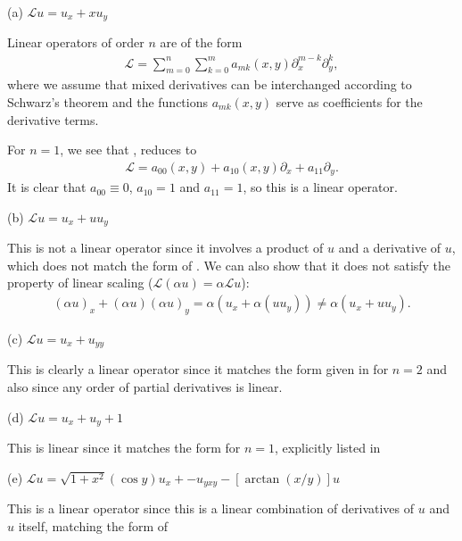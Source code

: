 \def\duedate{09/08/2022}
\def\HWnum{2}



    

(a) $\displaystyle \mathcal{L}u = u_{x} + x u_{y}$

Linear operators of order $n$ are of the form 
\begin{eqnarray}
    \label{eq:nth-lin-op}
    \mathcal{L} = \sum_{m=0}^{n} \sum_{k=0}^{m} a_{m k}(x,y) \partial_{x}^{m-k} \partial_{y}^{k}
,\end{eqnarray}
where we assume that mixed derivatives can be interchanged according to Schwarz's theorem and the functions $a_{m k}(x,y)$ serve as coefficients for the derivative terms.

For $n = 1$, we see that , reduces to
\begin{eqnarray}
    \label{eq:lin-op-1}
    \mathcal{L} = a_{00}(x,y) + a_{10}(x,y)\partial_{x} + a_{11}\partial_{y}
.\end{eqnarray}
It is clear that $a_{00} \equiv 0$, $a_{10} = 1$ and $a_{11} = 1$, so this is a linear operator.

(b) $\displaystyle \mathcal{L}u = u_{x} + u u_{y}$

This is not a linear operator since it involves a product of $u$ and a derivative of $u$, which does not match the form of .
We can also show that it does not satisfy the property of linear scaling ($\mathcal{L}(\alpha u) = \alpha \mathcal{L} u$):
\begin{eqnarray}
    \label{eq:disprove-b}
    (\alpha u)_{x} + (\alpha u)(\alpha u)_{y} = \alpha \left( u_{x} + \alpha (u u_{y}) \right) \ne \alpha (u_{x} + u u_{y})
.\end{eqnarray}


(c) $\displaystyle \mathcal{L}u = u_{x} + u_{yy}$

This is clearly a linear operator since it matches the form given in  for $n=2$ and also since any order of partial derivatives is linear.

(d) $\displaystyle \mathcal{L}u = u_{x} + u_{y} + 1$

This is linear since it matches the form  for $n=1$, explicitly listed in 

(e) $\displaystyle \mathcal{L}u = \sqrt{1 + x^2}(\cos{y})u_{x} +  - u_{yxy} - [\arctan(x/y)]u$

This is a linear operator since this is a linear combination of derivatives of $u$ and $u$ itself, matching the form of 


